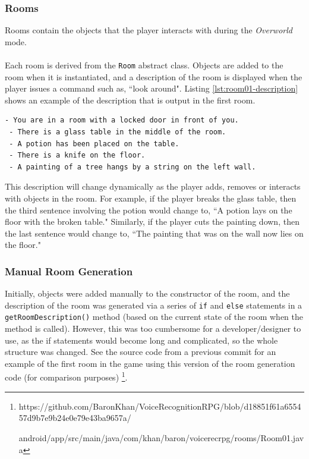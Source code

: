 \documentclass[11pt]{article}
\begin{document}
\subsubsection{Rooms}
Rooms contain the objects that the player interacts with during the \textit{Overworld} mode.
\\
\\
Each room is derived from the \texttt{Room} abstract class. Objects are added to the room when it is instantiated, and a description of the room is displayed when the player issues a command such as, ``look around". Listing \ref{lst:room01-description} shows an example of the description that is output in the first room.

\begin{lstlisting}[label=lst:room01-description]
 - You are in a room with a locked door in front of you.
 - There is a glass table in the middle of the room.
 - A potion has been placed on the table.
 - There is a knife on the floor.
 - A painting of a tree hangs by a string on the left wall.
\end{lstlisting}

This description will change dynamically as the player adds, removes or interacts with objects in the room. For example, if the player breaks the glass table, then the third sentence involving the potion would change to, ``A potion lays on the floor with the broken table." Similarly, if the player cuts the painting down, then the last sentence would change to, ``The painting that was on the wall now lies on the floor."

\subsubsection{Manual Room Generation}

Initially, objects were added manually to the constructor of the room, and the description of the room was generated via a series of \texttt{if} and \texttt{else} statements in a \texttt{getRoomDescription()} method (based on the current state of the room when the method is called). However, this was too cumbersome for a developer/designer to use, as the if statements would become long and complicated, so the whole structure was changed. See the source code from a previous commit for an example of the first room in the game using this version of the room generation code (for comparison purposes) \footnote{https://github.com/BaronKhan/VoiceRecognitionRPG/blob/d18851f61a655457d9b7e9b24e0e79e43ba9657a/

android/app/src/main/java/com/khan/baron/voicerecrpg/rooms/Room01.java}.
\end{document}
